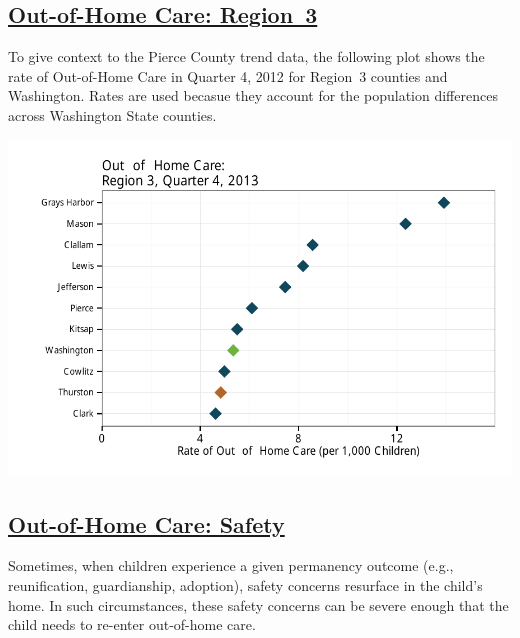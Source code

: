 \documentclass{article}\usepackage{graphicx, color}
\makeatletter
\def\maxwidth{ %
  \ifdim\Gin@nat@width>\linewidth
    \linewidth
  \else
    \Gin@nat@width
  \fi
}
\newenvironment{knitrout}{}{} %
\makeatother
\begin{document}
\subsection{\href{http://www.partnersforourchildren.org/child-well-being/visualizations/out-home-care/trends}
    {Out-of-Home Care: Region~3}
}
To give context to the Pierce County trend data, the following plot shows the rate of Out-of-Home Care in Quarter 4, 2012 for Region~3 counties and Washington. Rates are used becasue they account for the population differences across Washington State counties.
\nopagebreak[3]
\begin{knitrout}
\color{fgcolor}

{\centering \includegraphics[width=\maxwidth]{figure/ooh_context} 

}



\end{knitrout}


\subsection{\href{http://www.partnersforourchildren.org/child-well-being/visualizations/out-home-care/safety}
    {Out-of-Home Care: Safety}
}

Sometimes, when children experience a given permanency outcome (e.g., reunification, guardianship, adoption), safety concerns resurface in the child's home. In such circumstances, these safety concerns can be severe enough that the child needs to re-enter out-of-home care.
\end{document}
